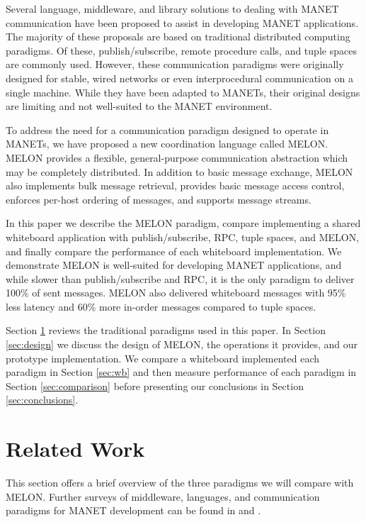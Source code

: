 \documentclass{llncs}
\begin{document}
Several language, middleware, and library solutions to dealing with MANET communication have been proposed to assist in developing MANET applications. The majority of these proposals are based on traditional distributed computing paradigms\cite{mine}. Of these, publish/subscribe, remote procedure calls, and tuple spaces are commonly used. However, these communication paradigms were originally designed for stable, wired networks or even interprocedural communication on a single machine. While they have been adapted to MANETs, their original designs are limiting and not well-suited to the MANET environment\cite{collins2010quantitative}.

To address the need for a communication paradigm designed to operate in MANETs, we have proposed a new coordination language called MELON\cite{melon}. MELON provides a flexible, general-purpose communication abstraction which may be completely distributed. In addition to basic message exchange, MELON also implements bulk message retrieval, provides basic message access control, enforces per-host ordering of messages, and supports message streams.

In this paper we describe the MELON paradigm, compare implementing a shared whiteboard application with publish/subscribe, RPC, tuple spaces, and MELON, and finally compare the performance of each whiteboard implementation. We demonstrate MELON is well-suited for developing MANET applications, and while slower than publish/subscribe and RPC, it is the only paradigm to deliver 100\% of sent messages. MELON also delivered whiteboard messages with 95\% less latency and 60\% more in-order messages compared to tuple spaces.

Section \ref{sec:relatedwork} reviews the traditional paradigms used in this paper. In Section \ref{sec:design} we discuss the design of MELON, the operations it provides, and our prototype implementation. We compare a whiteboard implemented each paradigm in Section \ref{sec:wb} and then measure performance of each paradigm in Section \ref{sec:comparison} before presenting our conclusions in Section \ref{sec:conclusions}.

\section{Related Work}\label{sec:relatedwork}

This section offers a brief overview of the three paradigms we will compare with MELON. Further surveys of middleware, languages, and communication paradigms for MANET development can be found in \cite{mine} and \cite{mwtrends}.
\end{document}
